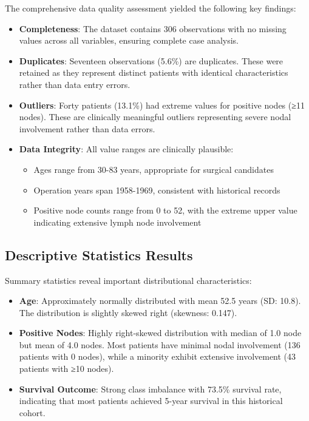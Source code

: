 \documentclass[12pt,a4paper]{article}
\begin{document}
The comprehensive data quality assessment yielded the following key findings:

\begin{itemize}
    \item \textbf{Completeness}: The dataset contains 306 observations with no missing values across all variables, ensuring complete case analysis.
    
    \item \textbf{Duplicates}: Seventeen observations (5.6\%) are duplicates. These were retained as they represent distinct patients with identical characteristics rather than data entry errors.
    
    \item \textbf{Outliers}: Forty patients (13.1\%) had extreme values for positive nodes (≥11 nodes). These are clinically meaningful outliers representing severe nodal involvement rather than data errors.
    
    \item \textbf{Data Integrity}: All value ranges are clinically plausible:
    \begin{itemize}
        \item Ages range from 30-83 years, appropriate for surgical candidates
        \item Operation years span 1958-1969, consistent with historical records
        \item Positive node counts range from 0 to 52, with the extreme upper value indicating extensive lymph node involvement
    \end{itemize}
\end{itemize}

\subsection{Descriptive Statistics Results}

Summary statistics reveal important distributional characteristics:

\begin{itemize}
    \item \textbf{Age}: Approximately normally distributed with mean 52.5 years (SD: 10.8). The distribution is slightly skewed right (skewness: 0.147).
    
    \item \textbf{Positive Nodes}: Highly right-skewed distribution with median of 1.0 node but mean of 4.0 nodes. Most patients have minimal nodal involvement (136 patients with 0 nodes), while a minority exhibit extensive involvement (43 patients with ≥10 nodes).
    
    \item \textbf{Survival Outcome}: Strong class imbalance with 73.5\% survival rate, indicating that most patients achieved 5-year survival in this historical cohort.
\end{itemize}
\end{document}
